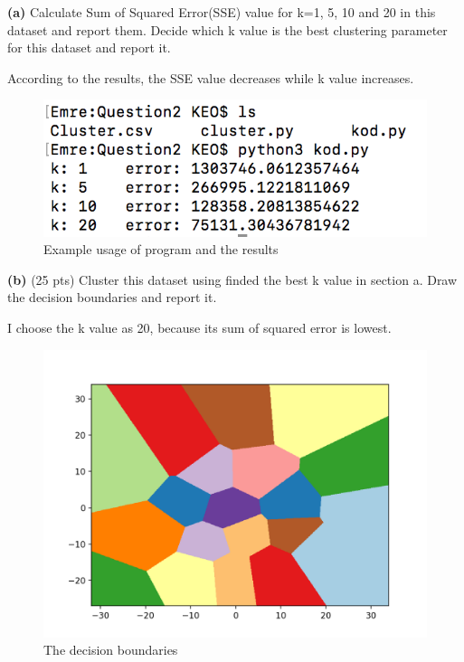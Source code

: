 \documentclass[11pt]{article}
\renewcommand\part[1]{\vspace{.10in}\textbf{(#1)}}
\begin{document}
\part{a} Calculate Sum of Squared Error(SSE) value for k=1, 5, 10 and 20 in this dataset and report them. Decide which k value is the best clustering parameter for this dataset and report it.

According to the results, the SSE value decreases while k value increases.

\begin{figure}[h]
	\centering
	\includegraphics[width=0.6\linewidth]{sum_of_squared_error}
	\caption{Example usage of program and the results}
	\label{fig:sum_of_squared_error}
\end{figure}

\cleardoublepage

\part{b} (25 pts) Cluster this dataset using finded the best k value in section a. Draw the decision boundaries and report it.

I choose the k value as 20, because its sum of squared error is lowest. 

\begin{figure}[h]
	\centering
	\includegraphics[width=0.6\linewidth]{decision_boundaries}
	\caption{The decision boundaries}
	\label{fig:decision_boundaries}
\end{figure}
\end{document}
